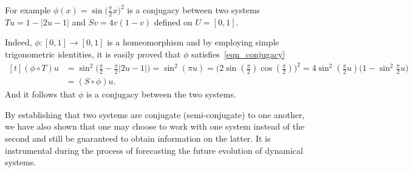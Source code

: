 \begin{Example}\rm
  For example $\phi(x)=\sin\big(\frac{\pi}{2}x\big)^2$ is a conjugacy between two systems $Tu=1-|2u-1|$ and $Sv=4v(1-v)$  defined on $U=[0,1]$.  

  Indeed, $\phi:[0,1]\to[0,1]$ is a homeomorphism and by employing simple trigonometric identities, it is easily proved that $\phi$ satisfies~\ref{eqn_conjugacy}
  \[
    \begin{aligned}[t]
      (\phi\circ{T})u 
                &=\sin^{2}\Big(\frac{\pi}{2} - \frac{\pi}{2}|2u-1|\Big) = \sin^{2}(\pi{u})=\Big(2\sin(\frac{\pi}{2})\cos(\frac{\pi}{2})\Big)^{2}=4\sin^{2}(\frac{\pi}{2}u)\Big(1-\sin^{2}\frac{\pi}{2}u\Big) \\
                                    &=({S}\circ\phi)u.
    \end{aligned}
\]
And it follows that $\phi$ is a conjugacy between the two systems.
\end{Example}


By establishing that two systems are conjugate (semi-conjugate) to one another, we have also shown that one may choose to work with one system instead of the second and still be guaranteed to obtain information on the latter. It is instrumental during the process of forecasting the future evolution of dynamical systems. 

